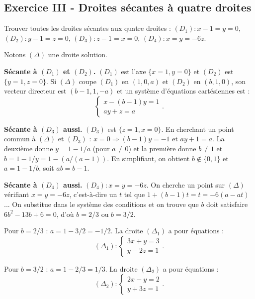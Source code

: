 \documentclass[12pt,a4paper]{article}
\begin{document}
\subsection*{Exercice III - Droites sécantes à quatre droites \niveau{\difficile}}

\begin{boiteexercice}
Trouver toutes les droites sécantes aux quatre droites :
$(D_1) : x-1=y=0$, \quad $(D_2) : y-1=z=0$, \quad $(D_3) : z-1=x=0$, \quad $(D_4) : x=y=-6z$.
\end{boiteexercice}

\begin{boitecorrige}
Notons $(\Delta)$ une droite solution.

\textbf{Sécante à $(D_1)$ et $(D_2)$.}
$(D_1)$ est l'axe $\{x=1, y=0\}$ et $(D_2)$ est $\{y=1, z=0\}$. Si $(\Delta)$ coupe $(D_1)$ en
$(1,0,a)$ et $(D_2)$ en $(b,1,0)$, son vecteur directeur est $(b-1,1,-a)$ et un système
d'équations cartésiennes est :
\[
  \begin{cases} x-(b-1)y = 1 \\ ay + z = a \end{cases}.
\]

\textbf{Sécante à $(D_3)$ aussi.}
$(D_3)$ est $\{z=1, x=0\}$. En cherchant un point commun à $(\Delta)$ et $(D_3)$ :
$x=0 \Rightarrow (b-1)y=-1$ et $ay+1=a$. La deuxième donne $y=1-1/a$ (pour $a\neq 0$) et
la première donne $b\neq 1$ et $b = 1 - 1/y = 1-(a/(a-1))$. En simplifiant, on obtient
$b\notin\{0,1\}$ et $a = 1-1/b$, soit $ab = b-1$.

\textbf{Sécante à $(D_4)$ aussi.}
$(D_4) : x=y=-6z$. On cherche un point sur $(\Delta)$ vérifiant $x=y=-6z$, c'est-à-dire un $t$
tel que $1+(b-1)t = t = -6(a-at)$... On substitue dans le système des conditions et on trouve que
$b$ doit satisfaire $6b^2 - 13b + 6 = 0$, d'où $b = 2/3$ ou $b = 3/2$.

Pour $b = 2/3$ : $a = 1-3/2 = -1/2$. La droite $(\Delta_1)$ a pour équations :
\[
  (\Delta_1) : \begin{cases} 3x+y = 3 \\ y-2z = 1 \end{cases}.
\]

Pour $b = 3/2$ : $a = 1-2/3 = 1/3$. La droite $(\Delta_2)$ a pour équations :
\[
  (\Delta_2) : \begin{cases} 2x-y = 2 \\ y+3z = 1 \end{cases}.
\]
\end{boitecorrige}
\end{document}
